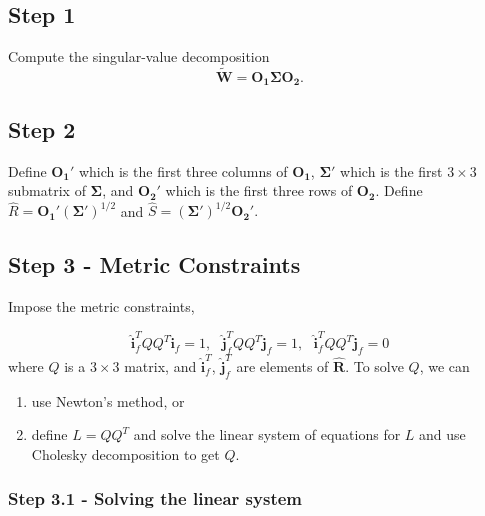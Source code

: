 \subsection{Step 1}

Compute the singular-value decomposition
$$ \tilde{\mathbf{W}} = \mathbf{O_1} \mathbf{\Sigma} \mathbf{O_2}. $$

\subsection{Step 2}

Define $ \mathbf{O_1}' $ which is the first three columns of $ \mathbf{O_1} $, $ \mathbf{\Sigma}' $ which is the first $ 3 \times 3 $ submatrix of $ \mathbf{\Sigma} $, and $ \mathbf{O_2}' $ which is the first three rows of $ \mathbf{O_2}. $
Define $ \hat{R} = \mathbf{O_1}'(\mathbf{\Sigma}')^{1/2} $ and $ \hat{S} = (\mathbf{\Sigma}')^{1/2}\mathbf{O_2}'. $

\subsection{Step 3 - Metric Constraints}

Impose the metric constraints, 

$$ \hat{\mathbf{i}}_f^T Q Q^T  \hat{\mathbf{i}}_f = 1, \ \ \ \hat{\mathbf{j}}_f^T Q Q^T  \hat{\mathbf{j}}_f = 1, \ \ \ \hat{\mathbf{i}}_f^T Q Q^T  \hat{\mathbf{j}}_f = 0 $$
where $ Q $ is a $ 3 \times 3 $ matrix, and $ \hat{\mathbf{i}}_f^T $, $ \hat{\mathbf{j}}_f^T $ are elements of $ \hat{\mathbf{R}}. $
To solve $ Q $, we can
\begin{enumerate}
\item use Newton's method, or 
\item define $ L = Q Q^T $ and solve the linear system of equations for $ L $ and use Cholesky decomposition to get $ Q. $ 
\end{enumerate}

\subsubsection{Step 3.1 - Solving the linear system}


